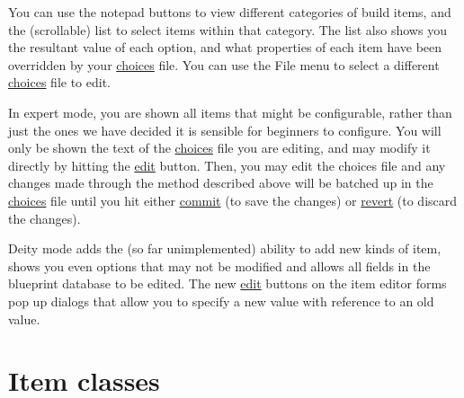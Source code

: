 \documentclass[a4paper]{article}
\begin{document}
You can use the notepad buttons to view different categories of build
items, and the (scrollable) list to select items within that
category. The list also shows you the resultant value of each option,
and what properties of each item have been overridden by your
\url{choices} file. You can use the File menu to select a different
\url{choices} file to edit.

In expert mode, you are shown all items that might be configurable,
rather than just the ones we have decided it is sensible for beginners
to configure. You will only be shown the text of the \url{choices}
file you are editing, and may modify it directly by hitting the
\url{edit} button. Then, you may edit the choices file and any changes
made through the method described above will be batched up in the
\url{choices} file until you hit either \url{commit} (to save the
changes) or \url{revert} (to discard the changes).

Deity mode adds the (so far unimplemented) ability to add new kinds of
item, shows you even options that may not be modified and allows all
fields in the blueprint database to be edited. The new \url{edit}
buttons on the item editor forms pop up dialogs that allow you to
specify a new value with reference to an old value.



\section{Item classes}
\end{document}
